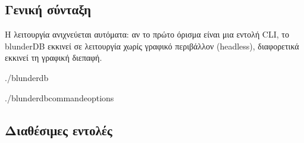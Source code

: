 \documentclass[letterpaper,10pt,greek]{sphinxmanual}
\begin{document}
\subsection{Γενική σύνταξη}
\label{\detokenize{cli:syntaxe-generale}}
\sphinxAtStartPar
Η λειτουργία ανιχνεύεται αυτόματα: αν το πρώτο όρισμα είναι μια εντολή CLI, το blunderDB εκκινεί σε λειτουργία χωρίς γραφικό περιβάλλον (headless), διαφορετικά εκκινεί τη γραφική διεπαφή.

\begin{sphinxVerbatim}[commandchars=\\\{\}]
./blunderdb

./blunderdb\PYGZlt{}commande\PYGZgt{}\PYG{o}{[}options\PYG{o}{]}
\end{sphinxVerbatim}


\subsection{Διαθέσιμες εντολές}
\label{\detokenize{cli:commandes-disponibles}}
\end{document}
